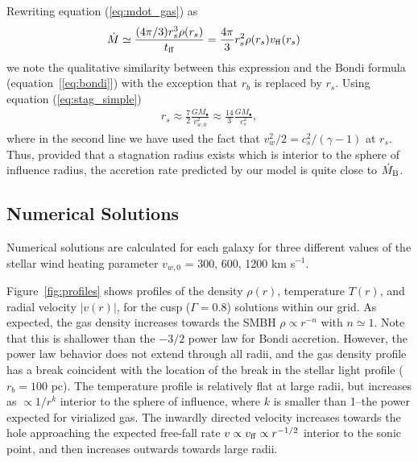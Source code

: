 \documentclass[usenatbib,fleqn]{mn2e}
\newcommand{\rs}{r_s}
\newcommand{\rb}{r_b}
\newcommand{\Mbh}[1][]{M_{\bullet#1}}
\newcommand{\vwO}{v_{w,0}}
\newcommand{\tff}{t_{\rm ff}}
\begin{document}
Rewriting equation (\ref{eq:mdot_gas}) as
\begin{align}
  &\dot{M}\simeq\frac{(4 \pi/3) \rs^3 \rho(\rs)}{\tff} =\frac{4
    \pi}{3} \rs^2 \rho(\rs) v_{\rm ff}(\rs)
\end{align}
we note the qualitative similarity between this expression and the Bondi formula (equation~[\ref{eq:bondi}]) with the exception that $\rb$ is replaced by $\rs$.  Using equation (\ref{eq:stag_simple})
\begin{align}
  \rs\approx\frac{7}{2}\frac{G \Mbh}{\vwO^2} \approx \frac{14}{3}\frac{GM_{\bullet}}{c_{s}^{2}},
  \label{eq:rs_simple}
\end{align}
where in the second line we have used the fact that $v_{w}^{2}/2 =
c_s^2/(\gamma-1)$ at $\rs$.  Thus, provided that a stagnation radius
exists which is interior to the sphere of influence radius, the
accretion rate predicted by our model is quite close to $\dot{M}_{\rm
  B}$.



\subsection{Numerical Solutions}

Numerical solutions are calculated for each galaxy for three different values of the stellar wind heating parameter $v_{w,0}$ = 300, 600, 1200 km s$^{-1}$.  

Figure~\ref{fig:profiles} shows profiles of the density $\rho(r)$,
temperature $T(r)$, and radial velocity $|v(r)|$, for the cusp
($\Gamma=0.8$) solutions within our grid.  As expected, the gas
density increases towards the SMBH $\rho\propto r^{-n}$ with
$n\simeq1$.  Note that this is shallower than the $-3/2$ power law for
Bondi accretion. However, the power law behavior does not extend
through all radii, and the gas density profile has a break coincident
with the location of the break in the stellar light profile ($\rb=100$
pc). The temperature profile is relatively flat at large radii, but
increases as $\propto 1/r^{k}$ interior to the sphere of influence,
where $k$ is smaller than 1--the power expected for virialized gas.
The inwardly directed velocity increases towards the hole approaching
the expected free-fall rate $v \propto v_{\rm ff}\propto r^{-1/2}$
interior to the sonic point, and then increases outwards towards large
radii.
\end{document}
